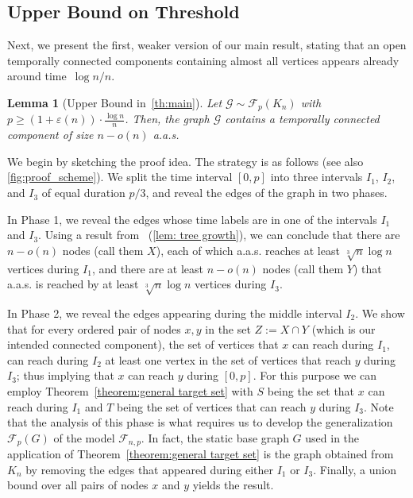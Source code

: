 \documentclass[a4paper,11pt]{article}
\makeatletter
\theoremstyle{definition}
\theoremstyle{plain}
\newtheorem{lemma}{Lemma}
\let\eps\varepsilon
\newcommand{\FFF}{\mathcal{F}}
\newcommand{\GGG}{\mathcal{G}}
\newcommand{\F}{\mathcal F}
\newcommand{\aas}{a.a.s.\@\xspace}
\makeatother
\begin{document}
\subsection{Upper Bound on Threshold}
\label{sec:threshold-upper}
Next, we present the first, weaker version of our main result,
stating that an open temporally connected components containing almost all vertices appears already around time~$\log n / n$.

\begin{lemma}[Upper Bound in~\cref{th:main}]\label{thm: upper bound}
	Let $\GGG \sim \FFF_{p}(K_n)$ with $p\ge (1+\eps(n))\cdot \frac{\log n}{n}$. Then, the graph $\GGG$ contains a temporally connected component of size $n-o(n)$ a.a.s.
\end{lemma}

We begin by sketching the proof idea.
The strategy is as follows (see also \cref{fig:proof_scheme}). We split the time interval $[0, p]$
into three intervals $I_{1}$, $I_{2}$, and $I_{3}$ of equal duration $p / 3$, and
reveal the edges of the graph in two phases.

In Phase 1, we reveal the edges whose
time labels are in one of the intervals $I_1$ and $I_3$. Using a result from~\cite{CasteigtsRRZ21} 
(\cref{lem: tree growth}), we can conclude that there are
$n - o(n)$ nodes (call them $X$), each of which \aas reaches at
least $\sqrt[3]{n}\log n$ vertices during $I_1$, and there are at least
$n - o(n)$ nodes (call them $Y$) that \aas is reached by at least $\sqrt[3]{n}\log n$
vertices during $I_3$.

In Phase 2, we reveal the edges appearing during the middle interval $I_2$.
We show that for every ordered pair of nodes $x,y$ in the set $Z := X \cap Y$ 
(which is our intended connected component), the set of vertices that $x$ can reach during $I_1$,
can reach during $I_2$ at least one vertex in the set of vertices that reach $y$ during $I_3$; thus
implying that $x$ can reach $y$ during $[0,p]$. For this purpose we can employ Theorem~\ref{theorem:general target set} with $S$ being the set that $x$ can reach during $I_1$ and $T$ being the set of vertices that can reach $y$ during $I_3$. Note that the analysis of this phase is what requires us to develop the generalization $\F_p(G)$ of the model $\F_{n,p}$. In fact, the static base graph $G$ used in the application of Theorem~\ref{theorem:general target set} is the graph obtained from $K_n$ by removing the edges that appeared during either $I_1$ or $I_3$. Finally, a union bound over all pairs of nodes $x$ and $y$ yields the result.
\end{document}

